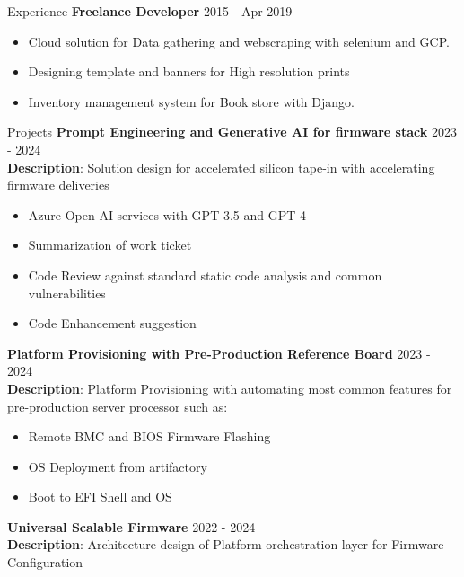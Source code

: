 \documentclass{resume} %
\begin{document}
\begin{rSection}{Experience}
{\textbf{Freelance Developer}}   \hfill {2015 - Apr 2019}
\begin{itemize}
    \item Cloud solution for Data gathering and webscraping with selenium and GCP.
    \item Designing template and banners for High resolution prints
    \item Inventory management system for Book store with Django.
\end{itemize}

\end{rSection}


\begin{rSection}{Projects}
{\bf Prompt Engineering and Generative AI for firmware stack} \hfill {2023 - 2024}\\
\textbf{Description}: Solution design for accelerated silicon tape-in with accelerating firmware deliveries

\begin{itemize}
    \item Azure Open AI services with GPT 3.5 and GPT 4
    \item Summarization of work ticket
    \item Code Review against standard static code analysis and common vulnerabilities
    \item Code Enhancement suggestion
\end{itemize}

\textbf{Platform Provisioning with Pre-Production Reference Board} \hfill {2023 - 2024}\\
\textbf{Description}: Platform Provisioning with automating most common features for pre-production server processor such as:

\begin{itemize}
    \item Remote BMC and BIOS Firmware Flashing
    \item OS Deployment from artifactory
    \item Boot to EFI Shell and OS
\end{itemize}

\textbf{Universal Scalable Firmware} \hfill {2022 - 2024} \\
\textbf{Description}: Architecture design of Platform orchestration layer for Firmware Configuration


\end{rSection}
\end{document}
